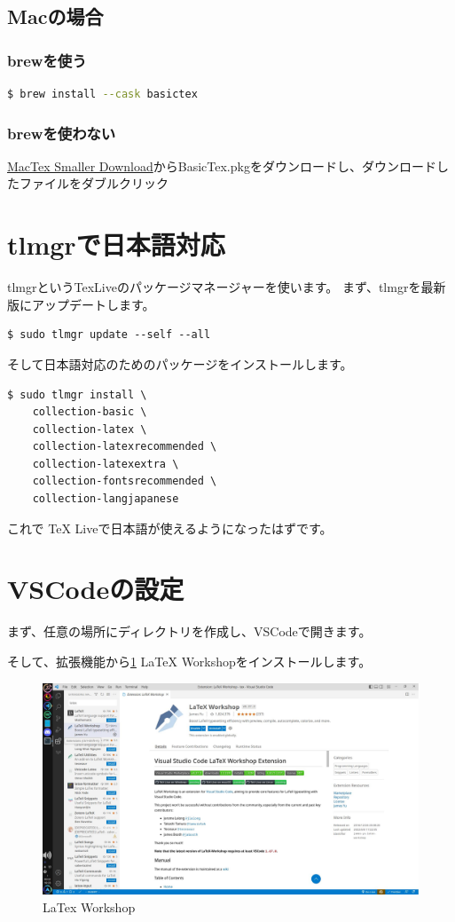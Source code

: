 \documentclass[twocolumn]{jarticle}
\begin{document}
\subsection{Macの場合 \cite{BasicTeX} }

\subsubsection{brewを使う}
\begin{lstlisting}[language=bash]
$ brew install --cask basictex
\end{lstlisting}

\subsubsection{brewを使わない}
\href{https://tug.org/mactex/morepackages.html}{MacTex Smaller Download}からBasicTex.pkgをダウンロードし、ダウンロードしたファイルをダブルクリック

\section{tlmgrで日本語対応}
tlmgrというTexLiveのパッケージマネージャーを使います。
まず、tlmgrを最新版にアップデートします。
\begin{lstlisting}
$ sudo tlmgr update --self --all
\end{lstlisting}
そして日本語対応のためのパッケージをインストールします。
\begin{lstlisting}
$ sudo tlmgr install \
    collection-basic \
    collection-latex \
    collection-latexrecommended \
    collection-latexextra \
    collection-fontsrecommended \
    collection-langjapanese
\end{lstlisting}
これで TeX Liveで日本語が使えるようになったはずです。

\section{VSCodeの設定}
まず、任意の場所にディレクトリを作成し、VSCodeで開きます。

そして、拡張機能から\ref{vscode} LaTeX Workshopをインストールします。
\begin{figure}[h]
    \centering
    \includegraphics[keepaspectratio, scale=0.1]{vscode.jpg}
    \caption{LaTex Workshop}
    \label{vscode}
\end{figure}
\end{document}
